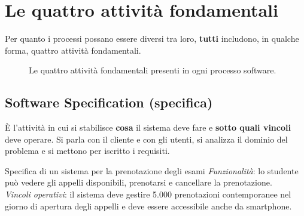 \section{Le quattro attività fondamentali}

Per quanto i processi possano essere diversi tra loro, \textbf{tutti} includono, in qualche forma, quattro attività fondamentali.

\begin{figure}[H]
\centering
{}
\caption{Le quattro attività fondamentali presenti in ogni processo software.}
\end{figure}

\subsection{Software Specification (specifica)}

È l'attività in cui si stabilisce \textbf{cosa} il sistema deve fare e \textbf{sotto quali vincoli} deve operare.
Si parla con il cliente e con gli utenti, si analizza il dominio del problema e si mettono per iscritto i requisiti.

\begin{esempio}{Specifica di un sistema per la prenotazione degli esami}
  \textit{Funzionalità}: lo studente può vedere gli appelli disponibili, prenotarsi e cancellare la prenotazione.\\
  \textit{Vincoli operativi}: il sistema deve gestire 5.000 prenotazioni contemporanee nel giorno di apertura degli appelli
  e deve essere accessibile anche da smartphone.
\end{esempio}

